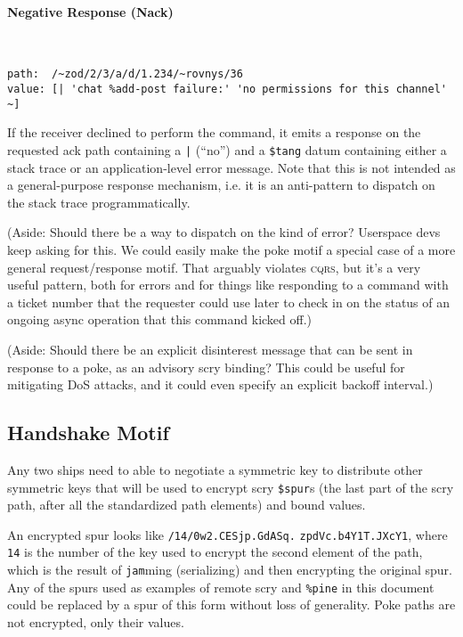 \documentclass[twoside]{article}
\begin{document}
\paragraph{Negative Response (Nack)} \mbox{}\\

\begin{lstlisting}[style=listingcode]
path:  /~zod/2/3/a/d/1.234/~rovnys/36
value: [| 'chat %add-post failure:' 'no permissions for this channel' ~]
\end{lstlisting}

If the receiver declined to perform the command, it emits a response on the requested ack path containing a \lstinline[style=inlinecode]{|} (``no'') and a \lstinline[style=inlinecode]{$tang} datum containing either a stack trace or an application-level error message. Note that this is not intended as a general-purpose response mechanism, i.e. it is an anti-pattern to dispatch on the stack trace programmatically.

(Aside:  Should there be a way to dispatch on the kind of error? Userspace devs keep asking for this. We could easily make the poke motif a special case of a more general request/response motif. That arguably violates \textsc{cqrs}, but it's a very useful pattern, both for errors and for things like responding to a command with a ticket number that the requester could use later to check in on the status of an ongoing async operation that this command kicked off.)

(Aside: Should there be an explicit disinterest message that can be sent in response to a poke, as an advisory scry binding? This could be useful for mitigating DoS attacks, and it could even specify an explicit backoff interval.)

\subsection{Handshake Motif}

Any two ships need to able to negotiate a symmetric key to distribute other symmetric keys that will be used to encrypt scry \lstinline[style=inlinecode]{$spur}s (the last part of the scry path, after all the standardized path elements) and bound values.

An encrypted spur looks like \lstinline[style=inlinecode]{/14/0w2.CESjp.GdASq.} \lstinline[style=inlinecode]{zpdVc.b4Y1T.JXcY1}, where \lstinline[style=inlinecode]{14} is the number of the key used to encrypt the second element of the path, which is the result of \lstinline[style=inlinecode]{jam}ming (serializing) and then encrypting the original spur. Any of the spurs used as examples of remote scry and \lstinline[style=inlinecode]{%pine} in this document could be replaced by a spur of this form without loss of generality. Poke paths are not encrypted, only their values.
\end{document}
